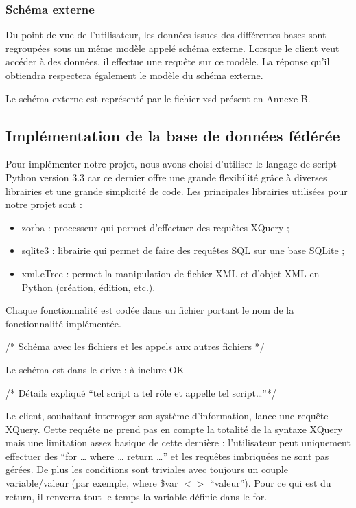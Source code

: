  \subsubsection{Schéma externe}

Du point de vue de l’utilisateur, les données issues des différentes bases sont regroupées sous un même modèle appelé schéma externe. Lorsque le client veut accéder à des données, il effectue une requête sur ce modèle. La réponse qu’il obtiendra respectera également le modèle du schéma externe.

Le schéma externe est représenté par le fichier xsd présent en Annexe B.

\subsection{Implémentation de la base de données fédérée}

Pour implémenter notre projet, nous avons choisi d’utiliser le langage de script Python version 3.3 car ce dernier offre une grande flexibilité grâce à diverses librairies et une grande simplicité de code. Les principales librairies utilisées pour notre projet sont :

\begin{itemize}
    \item zorba : processeur qui permet d’effectuer des requêtes XQuery ;

    \item sqlite3 : librairie qui permet de faire des requêtes SQL sur une base SQLite ;

    \item xml.eTree : permet la manipulation de fichier XML et d’objet XML en Python (création, édition, etc.).
\end{itemize}

Chaque fonctionnalité est codée dans un fichier portant le nom de la fonctionnalité implémentée.

/* Schéma avec les fichiers et les appels aux autres fichiers */

Le schéma est dans le drive : à inclure OK

/* Détails expliqué “tel script a tel rôle et appelle tel script…”*/

Le client, souhaitant interroger son système d’information, lance une requête XQuery. Cette requête ne prend pas en compte la totalité de la syntaxe XQuery mais une limitation assez basique de cette dernière : l’utilisateur peut uniquement effectuer des “for … where … return …” et les requêtes imbriquées ne sont pas gérées. De plus les conditions sont triviales avec toujours un couple variable/valeur (par exemple, where \$var $<>$ “valeur”). Pour ce qui est du return, il renverra tout le temps la variable définie dans le for.

